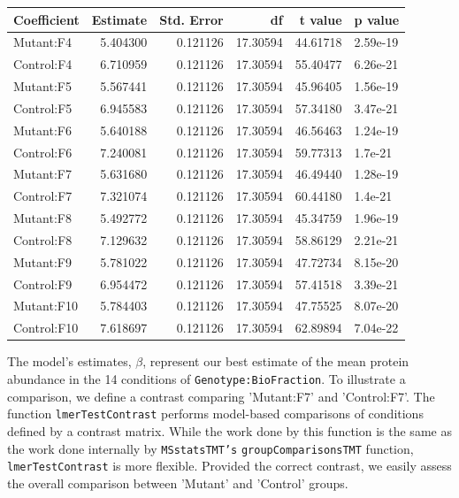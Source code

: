 \documentclass[11pt]{elife}\usepackage[]{graphicx}\usepackage[]{color}
\newenvironment{knitrout}{}{} %
\begin{document}
\begin{knitrout}
\color{fgcolor}
\begin{tabular}{l|r|r|r|r|l}
\hline
Coefficient & Estimate & Std. Error & df & t value & p value\\
\hline
Mutant:F4 & 5.404300 & 0.121126 & 17.30594 & 44.61718 & 2.59e-19\\
\hline
Control:F4 & 6.710959 & 0.121126 & 17.30594 & 55.40477 & 6.26e-21\\
\hline
Mutant:F5 & 5.567441 & 0.121126 & 17.30594 & 45.96405 & 1.56e-19\\
\hline
Control:F5 & 6.945583 & 0.121126 & 17.30594 & 57.34180 & 3.47e-21\\
\hline
Mutant:F6 & 5.640188 & 0.121126 & 17.30594 & 46.56463 & 1.24e-19\\
\hline
Control:F6 & 7.240081 & 0.121126 & 17.30594 & 59.77313 & 1.7e-21\\
\hline
Mutant:F7 & 5.631680 & 0.121126 & 17.30594 & 46.49440 & 1.28e-19\\
\hline
Control:F7 & 7.321074 & 0.121126 & 17.30594 & 60.44180 & 1.4e-21\\
\hline
Mutant:F8 & 5.492772 & 0.121126 & 17.30594 & 45.34759 & 1.96e-19\\
\hline
Control:F8 & 7.129632 & 0.121126 & 17.30594 & 58.86129 & 2.21e-21\\
\hline
Mutant:F9 & 5.781022 & 0.121126 & 17.30594 & 47.72734 & 8.15e-20\\
\hline
Control:F9 & 6.954472 & 0.121126 & 17.30594 & 57.41518 & 3.39e-21\\
\hline
Mutant:F10 & 5.784403 & 0.121126 & 17.30594 & 47.75525 & 8.07e-20\\
\hline
Control:F10 & 7.618697 & 0.121126 & 17.30594 & 62.89894 & 7.04e-22\\
\hline
\end{tabular}


\end{knitrout}

The model's estimates, $\beta$, represent our best estimate of the mean protein
abundance in the 14 conditions of \texttt{Genotype:BioFraction}. To illustrate a
comparison, we define a contrast comparing 'Mutant:F7' and 'Control:F7'.
The function  \texttt{lmerTestContrast} performs model-based comparisons of
conditions defined by a contrast matrix. While the work done by this function 
is the same as the work done internally by \texttt{MSstatsTMT's}
\texttt{groupComparisonsTMT} function, \texttt{lmerTestContrast} is more
flexible. Provided the correct contrast, we easily assess the overall comparison 
between 'Mutant' and 'Control' groups.\\
\end{document}
